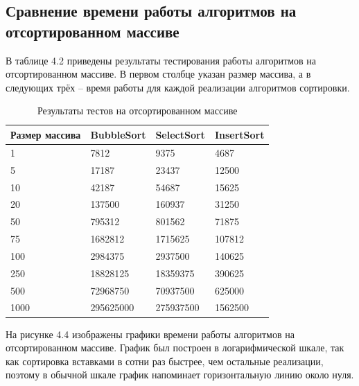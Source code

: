 \subsection{Сравнение времени работы алгоритмов на отсортированном массиве}
В таблице 4.2 приведены результаты тестирования работы алгоритмов на отсортированном массиве.
В первом столбце указан размер массива, а в следующих трёх -- время работы для каждой
реализации алгоритмов сортировки.

\FloatBarrier
\begin{table}[h]
	\caption{Результаты тестов на отсортированном массиве}
	\centering
	\begin{tabular}{ | l | l | l | l |}
		\hline
		Размер массива & BubbleSort & SelectSort & InsertSort \\ \hline
		1 & 7812 & 9375 & 4687 \\
		5 & 17187 & 23437 & 12500 \\
		10 & 42187 & 54687 &  15625 \\
		20 & 137500 & 160937 & 31250 \\
		50 & 795312 & 801562 & 71875 \\
		75 & 1682812 & 1715625 & 107812 \\
		100 & 2984375 & 2937500 & 140625 \\
		250 & 18828125 & 18359375 & 390625 \\
		500 & 72968750 & 70937500 & 625000 \\
		1000 & 295625000 & 275937500 & 1562500 \\
		\hline
	\end{tabular}
\end{table}
\FloatBarrier

На рисунке 4.4 изображены графики времени работы алгоритмов на отсортированном массиве.
График был построен в логарифмической шкале, так как сортировка вставками в сотни раз быстрее, чем
остальные реализации, поэтому в обычной шкале график напоминает горизонтальную линию около нуля.


